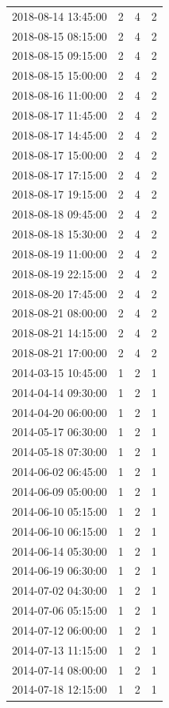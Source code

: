 \begin{tabular}{lrrr}
2018-08-14 13:45:00 & 2 & 4 & 2 \\
2018-08-15 08:15:00 & 2 & 4 & 2 \\
2018-08-15 09:15:00 & 2 & 4 & 2 \\
2018-08-15 15:00:00 & 2 & 4 & 2 \\
2018-08-16 11:00:00 & 2 & 4 & 2 \\
2018-08-17 11:45:00 & 2 & 4 & 2 \\
2018-08-17 14:45:00 & 2 & 4 & 2 \\
2018-08-17 15:00:00 & 2 & 4 & 2 \\
2018-08-17 17:15:00 & 2 & 4 & 2 \\
2018-08-17 19:15:00 & 2 & 4 & 2 \\
2018-08-18 09:45:00 & 2 & 4 & 2 \\
2018-08-18 15:30:00 & 2 & 4 & 2 \\
2018-08-19 11:00:00 & 2 & 4 & 2 \\
2018-08-19 22:15:00 & 2 & 4 & 2 \\
2018-08-20 17:45:00 & 2 & 4 & 2 \\
2018-08-21 08:00:00 & 2 & 4 & 2 \\
2018-08-21 14:15:00 & 2 & 4 & 2 \\
2018-08-21 17:00:00 & 2 & 4 & 2 \\
2014-03-15 10:45:00 & 1 & 2 & 1 \\
2014-04-14 09:30:00 & 1 & 2 & 1 \\
2014-04-20 06:00:00 & 1 & 2 & 1 \\
2014-05-17 06:30:00 & 1 & 2 & 1 \\
2014-05-18 07:30:00 & 1 & 2 & 1 \\
2014-06-02 06:45:00 & 1 & 2 & 1 \\
2014-06-09 05:00:00 & 1 & 2 & 1 \\
2014-06-10 05:15:00 & 1 & 2 & 1 \\
2014-06-10 06:15:00 & 1 & 2 & 1 \\
2014-06-14 05:30:00 & 1 & 2 & 1 \\
2014-06-19 06:30:00 & 1 & 2 & 1 \\
2014-07-02 04:30:00 & 1 & 2 & 1 \\
2014-07-06 05:15:00 & 1 & 2 & 1 \\
2014-07-12 06:00:00 & 1 & 2 & 1 \\
2014-07-13 11:15:00 & 1 & 2 & 1 \\
2014-07-14 08:00:00 & 1 & 2 & 1 \\
2014-07-18 12:15:00 & 1 & 2 & 1 \\

\end{tabular}
